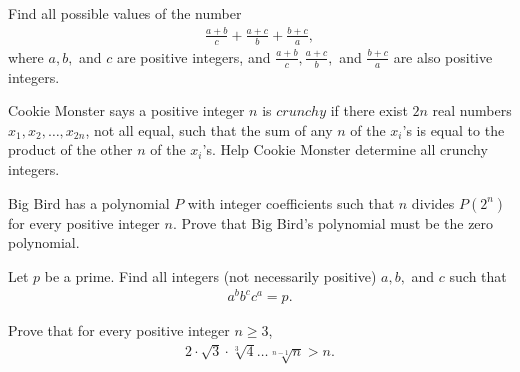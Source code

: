 \documentclass[problems.tex]{subfile}
\begin{document}
	
	
	
	\begin{problem}
		Find all possible values of the number
		\begin{align*}
			\frac{a+b}{c}+ \frac{a+c}{b}+ \frac{b+c}{a},
		\end{align*}
		where $a, b,$ and $c$ are positive integers, and $\displaystyle\frac{a+b}{c}, \frac{a+c}{b},$ and $\displaystyle\frac{b+c}{a}$ are also positive integers.
	\end{problem}
	
	
	
	
	
	\begin{problem}[ELMO 2016]
		Cookie Monster says a positive integer $n$ is $crunchy$ if there exist $2n$ real numbers $x_1,x_2,\ldots,x_{2n}$, not all equal, such that the sum of any $n$ of the $x_i$'s is equal to the product of the other $n$ of the $x_i$'s. Help Cookie Monster determine all crunchy integers. %
	\end{problem}
	
	
	
	\begin{problem}[ELMO $2016$]
		Big Bird has a polynomial $P$ with integer coefficients such that $n$ divides $P(2^n)$ for every positive integer $n$. Prove that Big Bird's polynomial must be the zero polynomial. %
	\end{problem}
	
	
	
	
	\begin{problem}
		Let $p$ be a prime. Find all integers (not necessarily positive) $a,b,$ and $c$ such that
		\begin{align*}
			a^bb^cc^a = p.
		\end{align*}
	\end{problem}
	
	
	
	\begin{problem}
		Prove that for every positive integer $n \geq 3$,
		\begin{align*}
			2 \cdot \sqrt 3 \cdot \sqrt[3]{4} \dots \sqrt[n-1]{n} >n.
		\end{align*}
	\end{problem}
	
\end{document}
